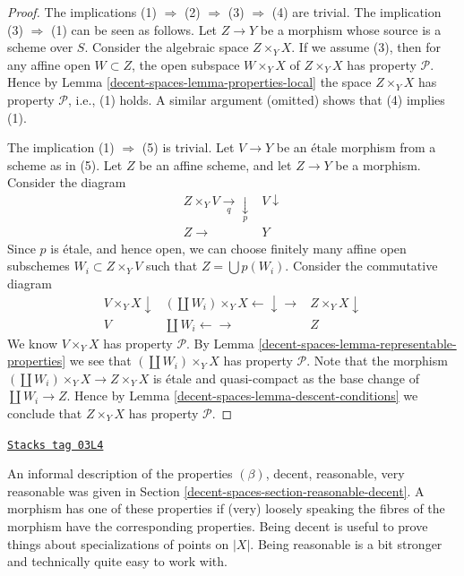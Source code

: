 \begin{proof}
The implications (1) $\Rightarrow$ (2) $\Rightarrow$ (3) $\Rightarrow$ (4)
are trivial.
The implication (3) $\Rightarrow$ (1) can be seen as follows.
Let $Z \to Y$ be a morphism whose source is a scheme over $S$.
Consider the algebraic space $Z \times_Y X$. If we assume (3), then
for any affine open $W \subset Z$, the open subspace
$W \times_Y X$ of $Z \times_Y X$ has property $\mathcal{P}$. Hence by
Lemma \ref{decent-spaces-lemma-properties-local}
the space $Z \times_Y X$ has property $\mathcal{P}$, i.e., (1) holds.
A similar argument (omitted) shows that (4) implies (1).

\medskip\noindent
The implication (1) $\Rightarrow$ (5) is trivial. Let $V \to Y$ be
an \'etale morphism from a scheme as in (5). Let $Z$ be an affine scheme,
and let $Z \to Y$ be a morphism. Consider the diagram
$$
\begin{array}{cc}Z \times_Y V \underset{q}{\longrightarrow}\underset{p}{\downarrow} & V \downarrow \\ Z \longrightarrow & Y\end{array}
$$
Since $p$ is \'etale, and hence open, we can choose finitely many affine open
subschemes $W_i \subset Z \times_Y V$ such that $Z = \bigcup p(W_i)$.
Consider the commutative diagram
$$
\begin{array}{ccc}V \times_Y X \downarrow & (\coprod W_i) \times_Y X \longleftarrow\downarrow\longrightarrow & Z \times_Y X \downarrow \\ V & \coprod W_i \longleftarrow\longrightarrow & Z\end{array}
$$
We know $V \times_Y X$ has property $\mathcal{P}$. By
Lemma \ref{decent-spaces-lemma-representable-properties}
we see that $(\coprod W_i) \times_Y X$ has property $\mathcal{P}$.
Note that the morphism $(\coprod W_i) \times_Y X \to Z \times_Y X$
is \'etale and quasi-compact as the base change of $\coprod W_i \to Z$.
Hence by Lemma \ref{decent-spaces-lemma-descent-conditions}
we conclude that $Z \times_Y X$ has property $\mathcal{P}$.
\end{proof}

\begin{remark}
\label{decent-spaces-remark-very-reasonable}
\href{https://stacks.math.columbia.edu/tag/03L4}{\texttt{Stacks tag 03L4}}

An informal description of the properties $(\beta)$, decent, reasonable,
very reasonable was given in Section \ref{decent-spaces-section-reasonable-decent}.
A morphism has one of these properties if (very) loosely speaking the
fibres of the morphism have the corresponding properties.
Being decent is useful to prove things about specializations of
points on $|X|$. Being reasonable is a bit stronger and technically
quite easy to work with.
\end{remark}

